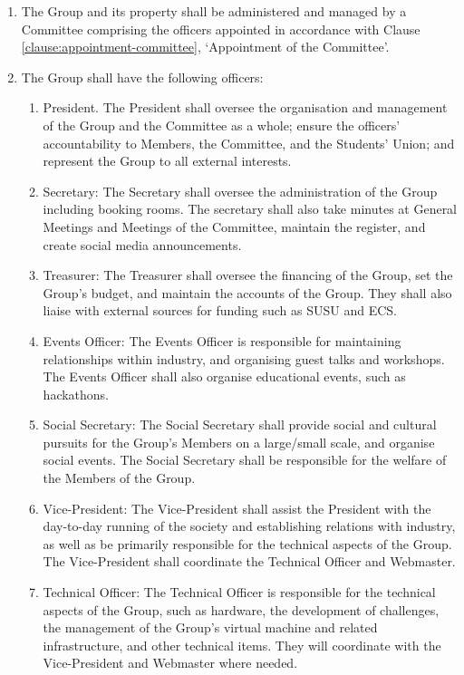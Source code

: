 \documentclass[12pt]{constitution}
\begin{document}
\begin{enumerate}
    \item The Group and its property shall be administered and managed by a Committee comprising the officers appointed in accordance with Clause \ref{clause:appointment-committee}, `Appointment of the Committee'.
    \item The Group shall have the following officers:
    \begin{enumerate}
        \item President. The President shall oversee the organisation and management of the Group and the Committee as a whole; ensure the officers’ accountability to Members, the Committee, and the Students’ Union; and represent the Group to all external interests.
        \item Secretary: The Secretary shall oversee the administration of the Group including booking rooms. The secretary shall also take minutes at General Meetings and Meetings of the Committee, maintain the register, and create social media announcements.
        \item Treasurer: The Treasurer shall oversee the financing of the Group, set the Group’s budget, and maintain the accounts of the Group. They shall also liaise with external sources for funding such as SUSU and ECS.
        \item Events Officer: The Events Officer is responsible for maintaining relationships within industry, and organising guest talks and workshops. The Events Officer shall also organise educational events, such as hackathons.
        \item Social Secretary: The Social Secretary shall provide social and cultural pursuits for the Group’s Members on a large/small scale, and organise social events. The Social Secretary shall be responsible for the welfare of the Members of the Group.
        \item Vice-President: The Vice-President shall assist the President with the day-to-day running of the society and establishing relations with industry, as well as be primarily responsible for the technical aspects of the Group. The Vice-President shall coordinate the Technical Officer and Webmaster.
        \item Technical Officer: The Technical Officer is responsible for the technical aspects of the Group, such as hardware, the development of challenges, the management of the Group's virtual machine and related infrastructure, and other technical items. They will coordinate with the Vice-President and Webmaster where needed.

\end{enumerate}
\end{enumerate}
\end{document}
